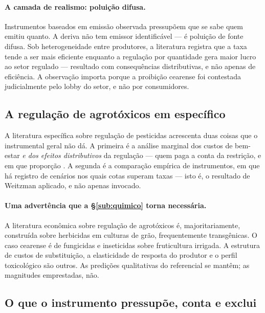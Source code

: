 \paragraph{A camada de realismo: poluição difusa.} Instrumentos baseados em
emissão observada pressupõem que se sabe quem emitiu quanto. A deriva não tem
emissor identificável --- é poluição de fonte difusa. Sob heterogeneidade entre
produtores, a literatura registra que a taxa tende a ser mais eficiente enquanto
a regulação por quantidade gera maior lucro ao setor regulado
\citep{helfand1995} --- resultado com consequências distributivas, e não apenas
de eficiência. A observação importa porque a proibição cearense foi contestada
judicialmente pelo lobby do setor, e não por consumidores.

\subsection{A regulação de agrotóxicos em específico}
\label{sub:regulacao}

A literatura específica sobre regulação de pesticidas acrescenta duas coisas que
o instrumental geral não dá. A primeira é a análise marginal dos custos de
bem-estar \emph{e dos efeitos distributivos} da regulação --- quem paga a conta
da restrição, e em que proporção \citep{lichtenberg1988,fernandezcornejo1998}.
A segunda é a comparação empírica de instrumentos, em que há registro de
cenários nos quais cotas superam taxas
\citep{skevas2012} --- isto é, o resultado de Weitzman aplicado, e não apenas
invocado.

\paragraph{Uma advertência que a §\ref{sub:quimico} torna necessária.} A
literatura econômica sobre regulação de agrotóxicos é, majoritariamente,
construída sobre herbicidas em culturas de grão, frequentemente transgênicas.
O caso cearense é de fungicidas e inseticidas sobre fruticultura irrigada. A
estrutura de custos de substituição, a elasticidade de resposta do produtor e o
perfil toxicológico são outros. As predições qualitativas do referencial se
mantêm; as magnitudes emprestadas, não.

\subsection{O que o instrumento pressupõe, conta e exclui}
\label{sub:normativo}

